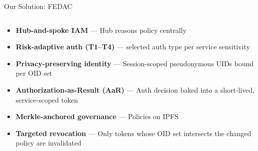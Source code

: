 \documentclass[aspectratio=169,11pt]{beamer}
\newcommand{\pinkbanner}[1]{%
  \begin{center}
  \begin{tcolorbox}[colback=fedacGray,colframe=fedacGray,
                    boxrule=0pt,arc=1mm,left=10pt,right=10pt,top=3pt,bottom=3pt,
                    width=0.96\linewidth,
                    borderline west={2pt}{0pt}{fedacTeal}]
  \footnotesize\color{fedacNavyD}#1
  \end{tcolorbox}
  \end{center}}
\begin{document}
\begin{frame}{Our Solution: FEDAC}
\vspace{0pt}
\begin{columns}[T,onlytextwidth]
\begin{column}{\textwidth}
\footnotesize
\begin{itemize}
  \setlength{\topsep}{1pt}\setlength{\itemsep}{6pt}\setlength{\parsep}{0pt}
  \item \textbf{Hub-and-spoke IAM} — Hub reasons policy centrally%
  \item \textbf{Risk-adaptive auth (T1–T4)} — selected auth type per service sensitivity%
  \item \textbf{Privacy-preserving identity} — Session-scoped pseudonymous UIDs bound per OID set%
  \item \textbf{Authorization-as-Result (AaR)} — Auth decision baked into a short-lived, service-scoped token%
  \item \textbf{Merkle-anchored governance} — Policies on IPFS%
  \item \textbf{Targeted revocation} — Only tokens whose OID set intersects the changed policy are invalidated%
\end{itemize}
\end{column}
\end{columns}
\end{frame}
\end{document}
